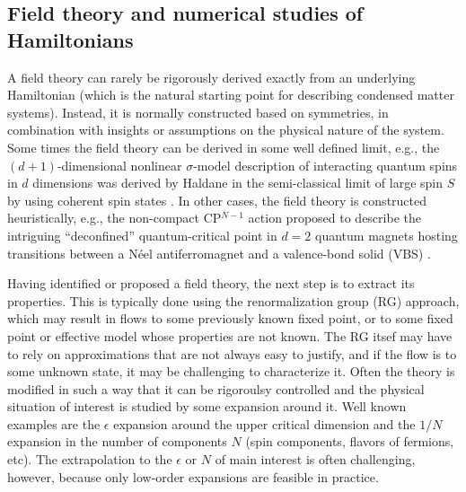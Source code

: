 \documentclass[range]{ar2e}
\begin{document}
\subsection{Field theory and numerical studies of Hamiltonians}

A field theory can rarely be rigorously derived exactly from 
an underlying Hamiltonian (which is the natural starting point for describing condensed matter systems). Instead,
it is normally constructed based on symmetries, in combination with insights or assumptions on the physical nature of 
the system. Some times the field theory can be derived in some well defined limit, e.g., the $(d+1)$-dimensional
nonlinear $\sigma$-model description of interacting quantum spins in $d$ dimensions was derived by Haldane in 
the semi-classical limit of large spin $S$ by using coherent spin states \cite{Haldane83,Chakravarty89,Auerbach94}. 
In other cases, the field theory is constructed heuristically, e.g., the non-compact CP$^{N-1}$ action
proposed to describe the intriguing ``deconfined'' quantum-critical point in $d=2$ quantum magnets hosting 
transitions between a N\'eel antiferromagnet and a valence-bond solid (VBS) \cite{Senthil04a,Sachdev08}.


Having identified or proposed a field
theory, the next step is to extract its properties. This is typically done using the renormalization group (RG)
approach, which may result in flows to some previously known fixed point, or to some fixed point or effective
model whose properties are not known. The RG itsef may have to rely on approximations that are not always easy
to justify, and if the flow is to some unknown state, it may be challenging to characterize it. Often the theory
is modified in such a way that it can be rigoroulsy controlled and the physical situation of interest is studied 
by some expansion around it. Well known examples are the $\epsilon$ expansion around the upper critical dimension 
and the $1/N$ expansion in the number of components $N$ (spin components, flavors of fermions, etc). The
extrapolation to the $\epsilon$ or $N$ of main interest is often challenging, however, because only low-order
expansions are feasible in practice.
\end{document}
